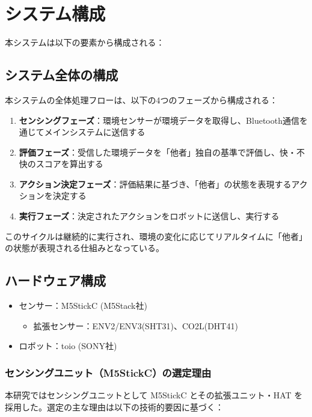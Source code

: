 \documentclass{cuxarticle}
\begin{document}
\section{システム構成}
本システムは以下の要素から構成される：

\subsection{システム全体の構成}
本システムの全体処理フローは、以下の4つのフェーズから構成される：

\begin{enumerate}
  \item \textbf{センシングフェーズ}：環境センサーが環境データを取得し、Bluetooth通信を通じてメインシステムに送信する
  \item \textbf{評価フェーズ}：受信した環境データを「他者」独自の基準で評価し、快・不快のスコアを算出する
  \item \textbf{アクション決定フェーズ}：評価結果に基づき、「他者」の状態を表現するアクションを決定する
  \item \textbf{実行フェーズ}：決定されたアクションをロボットに送信し、実行する
\end{enumerate}

このサイクルは継続的に実行され、環境の変化に応じてリアルタイムに「他者」の状態が表現される仕組みとなっている。

\subsection{ハードウェア構成}
\begin{itemize}
  \item センサー：M5StickC\cite{--M5StickC} (M5Stack社)
    \begin{itemize}
      \item 拡張センサー：ENV2/ENV3(SHT31)、CO2L(DHT41)
    \end{itemize}
  \item ロボット：toio\cite{--小さなキ} (SONY社)
\end{itemize}

\subsubsection{センシングユニット（M5StickC）の選定理由}
本研究ではセンシングユニットとして M5StickC とその拡張ユニット・HAT を採用した。選定の主な理由は以下の技術的要因に基づく：
\end{document}

